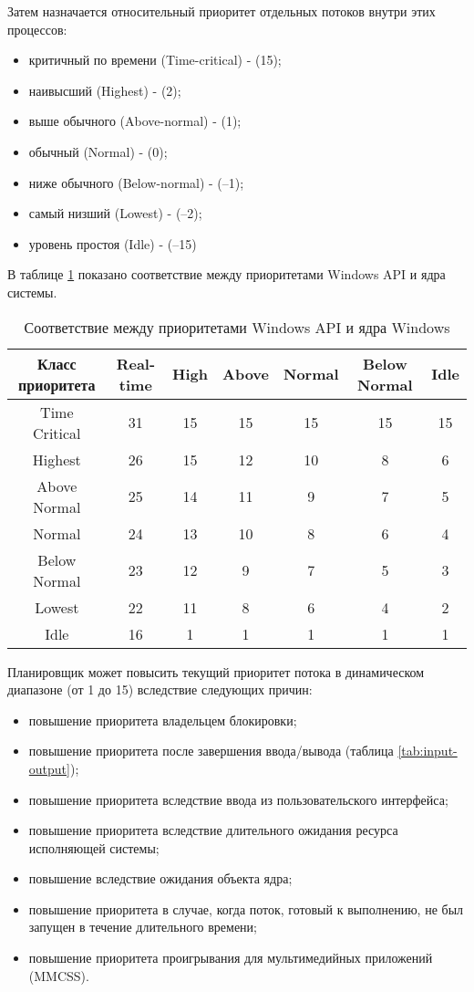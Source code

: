 Затем назначается относительный приоритет отдельных потоков внутри этих процессов:
\begin{itemize}
	\item критичный по времени (Time-critical) - (15);
	\item наивысший (Highest) - (2);
	\item выше обычного (Above-normal) - (1);
	\item обычный (Normal) - (0);
	\item ниже обычного (Below-normal) - (–1);
	\item самый низший (Lowest) - (–2);
	\item уровень простоя (Idle) - (–15)
\end{itemize}

В таблице \ref{tab:prioritet} показано соответствие между приоритетами Windows API и ядра системы.

\begin{table}[!h]
	\caption{Соответствие между приоритетами Windows API и ядра Windows}
	\begin{center}
		\begin{tabular}{|c|c|c|c|c|c|c|}
			\hline
			Класс приоритета & Real-time & High & Above &
			Normal & Below Normal & Idle \\ \hline
			Time Critical & 31 & 15 & 15 & 15 & 15 & 15 \\ \hline
			Highest & 26 & 15 & 12 & 10 & 8 & 6 \\ \hline
			Above Normal & 25 & 14 & 11 & 9 & 7 & 5 \\ \hline
			Normal & 24 & 13 & 10 & 8 & 6 & 4 \\ \hline
			Below Normal & 23 & 12 & 9 & 7 & 5 & 3 \\ \hline
			Lowest & 22 & 11 & 8 & 6 & 4 & 2 \\ \hline
			Idle & 16 & 1 & 1 & 1 & 1 & 1 \\ \hline
		\end{tabular}
	\end{center}
	\label{tab:prioritet}
\end{table}

Планировщик может повысить текущий приоритет потока в динамическом диапазоне (от 1 до 15) вследствие следующих причин:
\begin{itemize}
	\item повышение приоритета владельцем блокировки;
	\item повышение приоритета после завершения ввода/вывода (таблица \ref{tab:input-output});
	\item повышение приоритета вследствие ввода из пользовательского интерфейса;
	\item повышение приоритета вследствие длительного ожидания ресурса исполняющей системы;
	\item повышение вследствие ожидания объекта ядра;
	\item повышение приоритета в случае, когда поток, готовый к выполнению, не был запущен в течение длительного времени;
	\item повышение приоритета проигрывания для мультимедийных приложений (MMCSS). 
\end{itemize}

